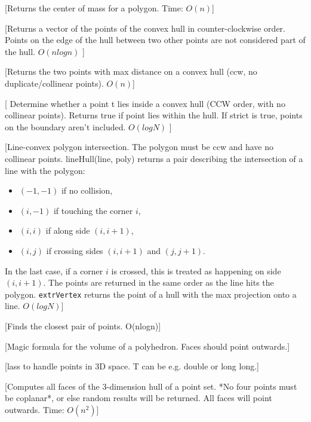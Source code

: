 [Returns the center of mass for a polygon. Time: $O(n)$]

[Returns a vector of the points of the convex hull in counter-clockwise order.
Points on the edge of the hull between two other points are not considered part of the hull. $O(nlogn)$
]%

[Returns the two points with max distance on a convex hull (ccw, no duplicate/collinear points). $O(n)$]

[
 Determine whether a point t lies inside a convex hull (CCW
 order, with no collinear points). Returns true if point lies within
 the hull. If strict is true, points on the boundary aren't included. $O(logN)$
]

[Line-convex polygon intersection. The polygon must be ccw and have no collinear points.
 lineHull(line, poly) returns a pair describing the intersection of a line with the polygon:
  \begin{itemize}
    \item $(-1, -1)$ if no collision,
    \item $(i, -1)$ if touching the corner $i$,
    \item $(i, i)$ if along side $(i, i+1)$,
    \item $(i, j)$ if crossing sides $(i, i+1)$ and $(j, j+1)$.
  \end{itemize}
  In the last case, if a corner $i$ is crossed, this is treated as happening on side $(i, i+1)$.
  The points are returned in the same order as the line hits the polygon.
 \texttt{extrVertex} returns the point of a hull with the max projection onto a line. $O(logN)$]

[Finds the closest pair of points. O(nlogn)]

[Magic formula for the volume of a polyhedron. Faces should point outwards.]

[lass to handle points in 3D space.	T can be e.g. double or long long.]

[Computes all faces of the 3-dimension hull of a point set. *No four points must be coplanar*, or else random results will be returned. All faces will point outwards. Time: $O(n^2)$]


